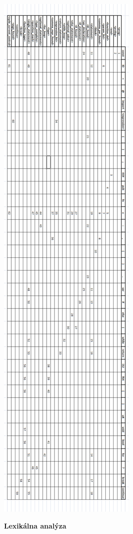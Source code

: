 \documentclass[12pt]{article}
\begin{document}
\includegraphics[height=0.9\textheight, scale=0.5]{LLtabulka}

\newpage

 \Large \textbf{Lexikálna analýza} \normalsize \\
\noindent\makebox[\linewidth]{\rule{\textwidth}{0.4pt}}
\end{document}
